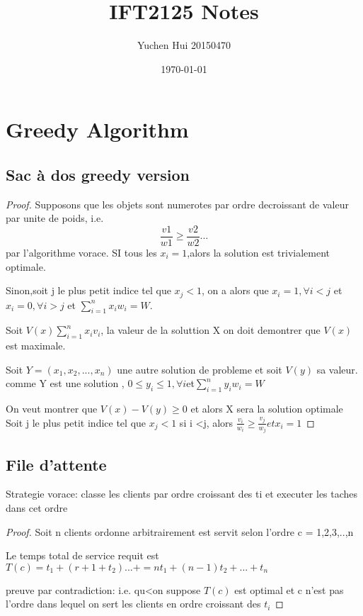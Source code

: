 \documentclass{article}
\title{\textbf{IFT2125 Notes}}
\author{Yuchen Hui 20150470}
\date{\today}
\theoremstyle{definition}
\theoremstyle{remark}
\newcommand{\pr}[1]{\left( #1 \right)}
\begin{document}
    \maketitle
    \tableofcontents
    \section{Greedy Algorithm}
        \subsection{Sac à dos greedy version}
        \begin{proof}
            Supposons que les objets sont numerotes par ordre
            decroissant de valeur par unite de poids, i.e.
            $$\frac{v1}{w1} \geq\frac{v2}{w2}... $$
            par l'algorithme vorace. SI tous les $x_i = 1$,alors la solution
            est trivialement optimale.

            Sinon,soit j le plus petit indice tel que $x_j < 1$, on a 
            alors que $x_i = 1, \forall i <j$ et $x_i  = 0, \forall i >j$
            et $\sum_{i=1}^n x_iw_i = W$.

            Soit $V\pr{x}\sum_{i=1}^n x_iv_i $, la valeur de la soluttion X
            on doit demontrer que $V\pr{x}$ est maximale.

            Soit $Y = \pr{x_1,x_2,...,x_n}$  une autre solution de probleme et soit $V\pr{y}$ sa valeur.
            comme Y est une solution , $0 \leq y_i \leq 1 ,\forall i $et$ \sum_{i=1}^n y_iw_i = W$
            
            On veut montrer que $V\pr{x} - V\pr{y} \geq 0$ et alors X sera la solution optimale
            Soit j le plus petit indice tel que $x_j < 1$ 
            si i <j, alors $\frac{v_i}{w_i} \geq\frac{v_j}{w_j}  et x_i = 1$

        



        \end{proof}
    \subsection{File d'attente}
    Strategie vorace: classe les clients par ordre croissant des ti et executer les taches dans cet ordre
    \begin{proof}
        Soit n clients ordonne arbitrairement est servit selon l'ordre
        c = 1,2,3,..,n
        
        Le temps total de service requit est $T\pr{c} = t_1+ \pr{r+1+t_2}...+ = nt_1 + \pr{n-1}t_2 +...+ t_n$

        preuve par contradiction: i.e. qu<on suppose $T\pr{c}$ est optimal et c n'est pas l'ordre
        dans lequel on sert les clients en ordre croissant des $t_i$
    \end{proof}
\end{document}
